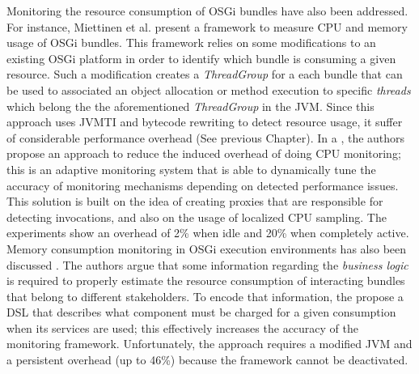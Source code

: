 Monitoring the resource consumption of OSGi bundles have also been addressed.
For instance, Miettinen et al. \cite{Miettinen2008} present a framework to measure CPU and memory usage of OSGi bundles.
This framework relies on some modifications to an existing OSGi platform in order to identify which bundle is consuming a given resource.
Such a modification creates a \textit{ThreadGroup} for a each bundle that can be used to associated an object allocation or method execution to specific \textit{threads} which belong the the aforementioned \textit{ThreadGroup} in the JVM.
Since this approach uses JVMTI and bytecode rewriting to detect resource usage, it suffer of considerable performance overhead (See previous Chapter).
In a \cite{Maurel:2012:AME:2304736.2304763}, the authors propose an approach to reduce the induced overhead of doing CPU monitoring; this is an adaptive monitoring system that is able to dynamically tune the accuracy of monitoring mechanisms depending on detected performance issues.
This solution is built on the idea of creating proxies that are responsible for detecting invocations, and also on the usage of localized CPU sampling.
The experiments show an overhead of 2\% when idle and 20\% when completely active.
Memory consumption monitoring in OSGi execution environments has also been discussed \cite{Attouchi:2014:MMM:2602458.2602467}.
The authors argue that some information regarding the \textit{business logic} is required to properly estimate the resource consumption of interacting bundles that belong to different stakeholders. 
To encode that information, the propose a DSL that describes what component must be charged for a given consumption when its services are used; this effectively increases the accuracy of the monitoring framework.
Unfortunately, the approach requires a modified JVM and a persistent overhead (up to 46\%) because the framework cannot be deactivated.

